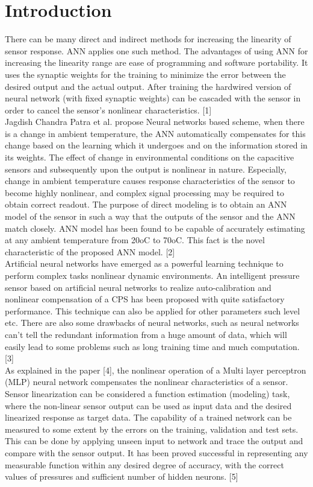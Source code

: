 \documentclass[conference]{IEEEtran}
\begin{document}
\section{Introduction}
There can be many direct and indirect methods for increasing the linearity of sensor response. ANN applies one such method. The advantages of using ANN for increasing the linearity range are ease of programming and software portability. It uses the synaptic weights for the training to minimize the error between the desired output and the actual output. After training the hardwired version of neural network (with fixed synaptic weights) can be cascaded with the sensor in order to cancel the sensor’s nonlinear characteristics. [1]\\
Jagdish Chandra Patra et al. propose Neural networks based scheme, when there is a change in ambient temperature, the ANN automatically compensates for this change based on the learning which it undergoes and on the information stored in its weights. The effect of change in environmental conditions on the capacitive sensors and subsequently upon the output is nonlinear in nature. Especially, change in ambient temperature causes response characteristics of the sensor to become highly nonlinear, and complex signal processing may be required to obtain correct readout. The purpose of direct modeling is to obtain an ANN model of the sensor in such a way that the outputs of the sensor and the ANN match closely. ANN model has been found to be capable of accurately estimating at any ambient temperature from 20oC to 70oC. This fact is the novel characteristic of the proposed ANN model. [2]\\
Artificial neural networks have emerged as a powerful learning technique to perform complex tasks nonlinear dynamic environments. An intelligent pressure sensor based on artificial neural networks to realize auto-calibration and nonlinear compensation of a CPS has been proposed with quite satisfactory performance. This technique can also be applied for other parameters such level etc. There are also some drawbacks of neural networks, such as neural networks can’t tell the redundant information from a huge amount of data, which will easily lead to some problems such as long training time and much computation. [3]\\
As explained in the paper [4], the nonlinear operation of a Multi layer perceptron (MLP) neural network compensates the nonlinear characteristics of a sensor. Sensor linearization can be considered a function estimation (modeling) task, where the non-linear sensor output can be used as input data and the desired linearized response as target data. 
The capability of a trained network can be measured to some extent by the errors on the training, validation and test sets. This can be done by applying unseen input to network and trace the output and compare with the sensor output. It has been proved successful in representing any measurable function within any desired degree of accuracy, with the correct values of pressures and sufficient number of hidden neurons. [5]
\end{document}
